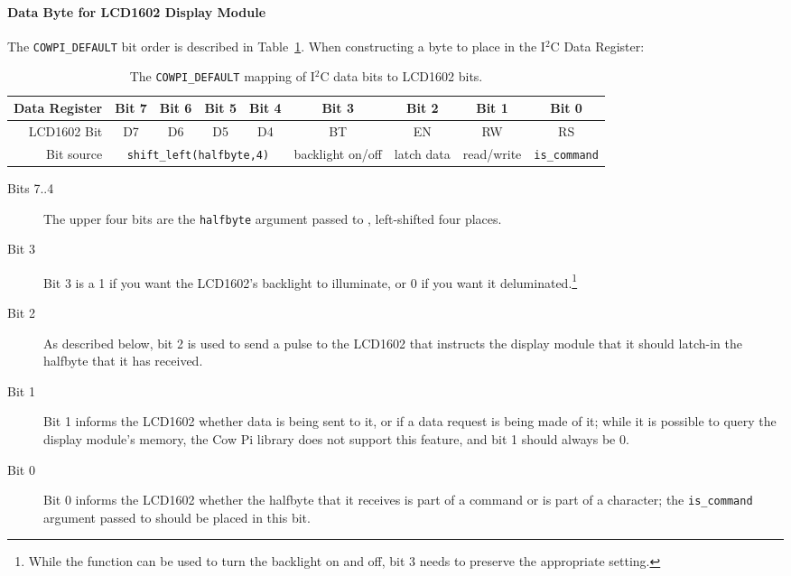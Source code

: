 \paragraph{Data Byte for LCD1602 Display Module}


The \lstinline{COWPI_DEFAULT} bit order is described in Table~\ref{tab:LCD1602bits}.
When constructing a byte to place in the I$^2$C Data Register:

\begin{table}
    \centering \footnotesize
    \begin{tabular}{|r||c|c|c|c|c|c|c|c|} \hline
        Data Register   & Bit 7 & Bit 6 & Bit 5 & Bit 4 & Bit 3 & Bit 2 & Bit 1 & Bit 0 \\ \hline
        LCD1602 Bit     & D7    & D6    & D5    & D4    & BT    & EN    & RW    & RS    \\ \hline
        Bit source      & \multicolumn{4}{|c|}{\lstinline{shift_left(halfbyte,4)}} & backlight on/off & latch data & read/write & \texttt{is\_command} \\ \hline %
    \end{tabular}
    \caption{The \lstinline{COWPI_DEFAULT} mapping of I$^2$C data bits to LCD1602 bits. \label{tab:LCD1602bits}}
\end{table}

\begin{description}
    \item[Bits 7..4] The upper four bits are the \lstinline{halfbyte} argument passed to , left-shifted four places.
    \item[Bit 3] Bit 3 is a 1 if you want the LCD1602's backlight to illuminate, or 0 if you want it deluminated.\footnote{
        While the  function can be used to turn the backlight on and off, bit 3 needs to preserve the appropriate setting.}
    \item[Bit 2] As described below, bit 2 is used to send a pulse to the LCD1602 that instructs the display module that it should latch-in the halfbyte that it has received.
    \item[Bit 1] Bit 1 informs the LCD1602 whether data is being sent to it, or if a data request is being made of it;
        while it is possible to query the display module's memory, the Cow Pi library does not support this feature, and bit 1 should always be 0.
    \item[Bit 0] Bit 0 informs the LCD1602 whether the halfbyte that it receives is part of a command or is part of a character;
        the \lstinline{is_command} argument passed to  should be placed in this bit.
\end{description}

